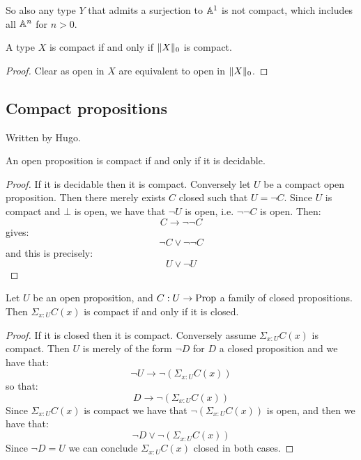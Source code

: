 So also any type $Y$ that admits a surjection to $\mathbb{A}^1$ is not compact, which includes all $\mathbb{A}^n$ for $n>0$.

\begin{lemma}
A type $X$ is compact if and only if $\lVert X \rVert_0$ is compact.
\end{lemma}

\begin{proof}
Clear as open in $X$ are equivalent to open in $\lVert X \rVert_0$.
\end{proof}

\subsection{Compact propositions}

Written by Hugo.

\begin{lemma}
An open proposition is compact if and only if it is decidable.
\end{lemma}

\begin{proof}
If it is decidable then it is compact. Conversely let $U$ be a compact open proposition. Then there merely exists $C$ closed such that $U = \neg C$. Since $U$ is compact and $\bot$ is open, we have that $\neg U$ is open, i.e. $\neg\neg C$ is open. Then:
\[C\to \neg\neg C\]
gives:
\[\neg C \lor \neg\neg C\]
and this is precisely:
\[U \lor \neg U\] 
\end{proof}

\begin{lemma}\label{compact-proposition-scheme-are-closed}
Let $U$ be an open proposition, and $C:U\to \mathrm{Prop}$ a family of closed propositions. Then $\Sigma_{x:U}C(x)$ is compact if and only if it is closed.
\end{lemma}

\begin{proof}
If it is closed then it is compact. Conversely assume $\Sigma_{x:U}C(x)$ is compact. Then $U$ is merely of the form $\neg D$ for $D$ a closed proposition and we have that:
\[\neg U \to \neg(\Sigma_{x:U}C(x))\]
so that:
\[D\to \neg(\Sigma_{x:U}C(x))\]
Since $\Sigma_{x:U}C(x)$ is compact we have that $\neg(\Sigma_{x:U}C(x))$ is open, and then we have that:
\[\neg D \lor \neg(\Sigma_{x:U}C(x))\]
Since $\neg D = U$ we can conclude $\Sigma_{x:U}C(x)$ closed in both cases.
\end{proof}
